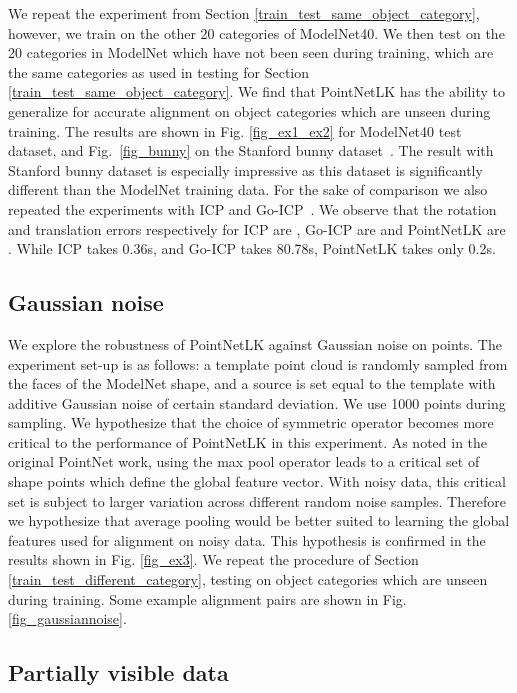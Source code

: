 \documentclass[10pt,twocolumn,letterpaper]{article}
\begin{document}
We repeat the experiment from Section \ref{train_test_same_object_category}, however, we train on the other 20 categories of ModelNet40. We then test on the 20 categories in ModelNet which have not been seen during training, which are the same categories as used in testing for Section \ref{train_test_same_object_category}. We find that PointNetLK has the ability to generalize for accurate alignment on object categories which are unseen during training. The results are shown in Fig. \ref{fig_ex1_ex2} for ModelNet40 test dataset, and Fig.~\ref{fig_bunny} on the Stanford bunny dataset~\cite{turk2005stanford}. The result with Stanford bunny dataset is especially impressive as this dataset is significantly different than the ModelNet training data. For the sake of comparison we also repeated the experiments with ICP and Go-ICP~\cite{Yang13}. We observe that the rotation and translation errors respectively for ICP are , Go-ICP are  and PointNetLK are . While ICP takes 0.36s, and Go-ICP takes 80.78s, PointNetLK takes only 0.2s. 


\subsection{Gaussian noise} \label{gaussian_noise}

We explore the robustness of PointNetLK against Gaussian noise on points. The experiment set-up is as follows: a template point cloud is randomly sampled from the faces of the ModelNet shape, and a source is set equal to the template with additive Gaussian noise of certain standard deviation. We use 1000 points during sampling. We hypothesize that the choice of symmetric operator becomes more critical to the performance of PointNetLK in this experiment. As noted in the original PointNet work, using the max pool operator leads to a critical set of shape points which define the global feature vector. With noisy data, this critical set is subject to larger variation across different random noise samples. Therefore we hypothesize that average pooling would be better suited to learning the global features used for alignment on noisy data. This hypothesis is confirmed in the results shown in Fig. \ref{fig_ex3}.  We repeat the procedure of Section \ref{train_test_different_category}, testing on object categories which are unseen during training. Some example alignment pairs are shown in Fig. \ref{fig_gaussiannoise}.



\subsection{Partially visible data} \label{partially_visible_data}
\end{document}
